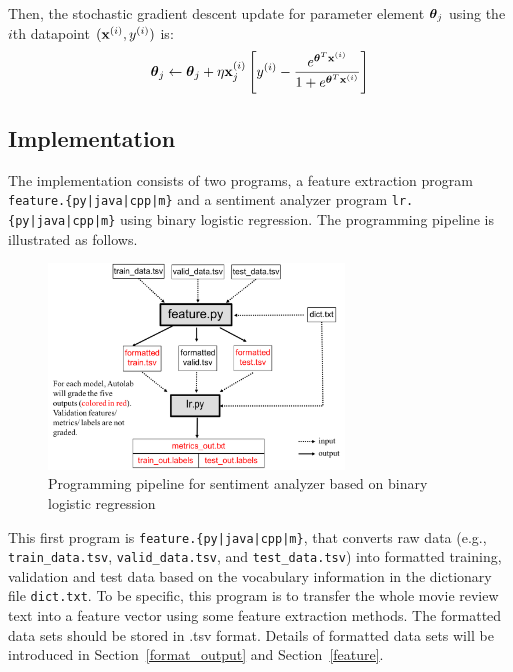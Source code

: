 Then, the stochastic gradient descent update for  parameter element $\boldsymbol \theta_j$ using the $i$th datapoint $(\mathbf x^{(i)},y^{(i)})$ is:
\begin{align}
    \boldsymbol \theta_j \leftarrow \boldsymbol \theta_j + \eta \mathbf x_j^{\left(i\right)}\left[y^{(i)}-\frac{e^{\boldsymbol \theta^T\mathbf x^{\left(i\right)}}}{1+e^{\boldsymbol \theta^T\mathbf x^{\left(i\right)}}}\right]
\end{align}
 


\subsection{Implementation}

The implementation consists of two programs, a feature extraction program \texttt{feature.\{py|java|cpp|m\}} and a sentiment analyzer program \texttt{lr.\{py|java|cpp|m\}} using binary logistic regression. The programming pipeline is illustrated as follows.

\begin{figure}[H]
        \centering
        \includegraphics[width = 0.7\textwidth]{Pipeline.png}
        \caption{Programming pipeline for sentiment analyzer based on binary logistic regression}
        \label{pipeline}
\end{figure}


This first program is \texttt{feature.\{py|java|cpp|m\}}, that converts raw data (e.g., \lstinline{train_data.tsv}, \lstinline{valid_data.tsv}, and \lstinline{test_data.tsv}) into formatted training, validation and test data based on the vocabulary information in the dictionary file \lstinline{dict.txt}. To be specific, this program is to transfer the whole movie review text into a feature vector using some feature extraction methods. The formatted data sets should be stored in .tsv format. Details of formatted data sets will be introduced in Section~\ref{format_output} and Section~\ref{feature}.

